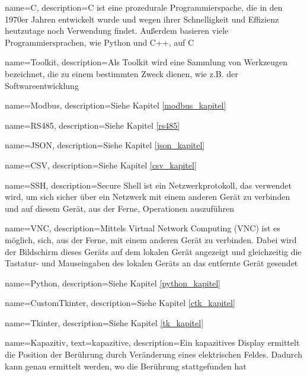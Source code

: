 {
	name=C,
	description={C ist eine prozedurale Programmierspache, die in den 1970er Jahren entwickelt wurde und wegen ihrer Schnelligkeit und Effizienz heutzutage noch Verwendung findet. Außerdem basieren viele Programmiersprachen, wie \zB Python und C++, auf C}
}

{
	name=Toolkit,
	description={Als Toolkit wird eine Sammlung von Werkzeugen bezeichnet, die zu einem bestimmten Zweck dienen, wie z.B. der Softwareentwicklung}
}

{
	name=Modbus,
	description={Siehe Kapitel \ref{modbus_kapitel} }
}

{
	name=RS485,
	description={Siehe Kapitel \ref{rs485} }
}

{
	name=JSON,
	description={Siehe Kapitel \ref{json_kapitel} }
}

{
	name=CSV,
	description={Siehe Kapitel \ref{csv_kapitel} }
}

{
	name=SSH,
	description={Secure Shell ist ein Netzwerkprotokoll, das verwendet wird, um sich sicher über ein Netzwerk mit einem anderen Gerät zu verbinden und auf diesem Gerät, aus der Ferne, Operationen auszuführen}
}

{
	name=VNC,
	description={Mittels Virtual Network Computing (VNC) ist es möglich, sich, aus der Ferne, mit einem anderen Gerät zu verbinden. Dabei wird der Bildschirm dieses Geräts auf dem lokalen Gerät angezeigt und gleichzeitig die Tastatur- und Mauseingaben des lokalen Geräts an das entfernte Gerät gesendet}
}

{
	name=Python,
	description={Siehe Kapitel \ref{python_kapitel} }
}

{
	name=CustomTkinter,
	description={Siehe Kapitel \ref{ctk_kapitel} }
}

{
	name=Tkinter,
	description={Siehe Kapitel \ref{tk_kapitel} }
}

{
	name=Kapazitiv,
    	text=kapazitive,
	description={Ein kapazitives Display ermittelt die Position der Berührung durch Veränderung eines elektrischen Feldes. Dadurch kann genau ermittelt werden, wo die Berührung stattgefunden hat}
}

